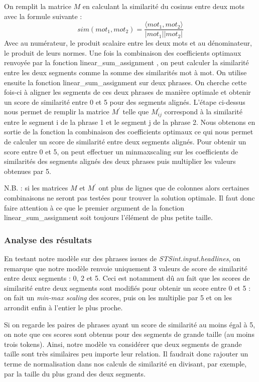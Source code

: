 \documentclass[a4paper, twoside, 11pt]{article}
\begin{document}
 On remplit la matrice $M$ en calculant la similarité du cosinus entre deux mots avec la formule suivante :
 \begin{equation}
    sim(mot_{1}, mot_{2})=\frac{\langle mot_{1}, mot_{2}\rangle}{|mot_{1}||mot_{2}|}
 \end{equation}
 Avec au numérateur, le produit scalaire entre les deux mots et au dénominateur, le produit de leurs normes. Une fois la combinaison des coefficients optimaux renvoyée par la fonction \og linear\_sum\_assignment \fg{}, on peut calculer la similarité entre les deux segments comme la somme des similarités mot à mot. On utilise ensuite la fonction \og linear\_sum\_assignment \fg{} sur deux phrases. On cherche cette fois-ci à aligner les segments de ces deux phrases de manière optimale et obtenir un score de similarité entre 0 et 5 pour des segments alignés. L’étape ci-dessus nous permet de remplir la matrice $M^{\prime}$ telle que $M^{\prime}_{ij}$ correspond à la similarité entre le segment i de la phrase 1 et le segment j de la phrase 2. Nous obtenons en sortie de la fonction la combinaison des coefficients optimaux ce qui nous permet de calculer un score de similarité entre deux segments alignés. Pour obtenir un score entre 0 et 5, on peut effectuer un \og minmaxscaling \fg{} sur les coefficients de similarités des segments alignés des deux phrases puis multiplier les valeurs obtenues par 5.

N.B. : si les matrices $M$ et $M^{\prime}$ ont plus de lignes que de colonnes alors certaines combinaisons ne seront pas testées pour trouver la solution optimale.
Il faut donc faire attention à ce que le premier argument de la fonction \og linear\_sum\_assignment \fg{} soit toujours l’élément de plus petite taille.

 \subsubsection{Analyse des résultats}

 En testant notre modèle sur des phrases issues de \textit{STSint.input.headlines}, on remarque que notre modèle renvoie uniquement 3 valeurs de score de similarité entre deux segments : 0, 2 et 5. Ceci est notamment dû au fait que les scores de similarité entre deux segments sont modifiés pour obtenir un score entre 0 et 5 : on fait un \textit{min-max scaling} des scores, puis on les multiplie par 5 et on les arrondit enfin à l'entier le plus proche.

 Si on regarde les paires de phrases ayant un score de similarité au moins égal à 5, on note que ces scores sont obtenus pour des segments de grande taille (au moins trois tokens). Ainsi, notre modèle va considérer que deux segments de grande taille sont très similaires peu importe leur relation. Il faudrait donc rajouter un terme de normalisation dans nos calculs de similarité en divisant, par exemple, par la taille du plus grand des deux segments.
\end{document}
